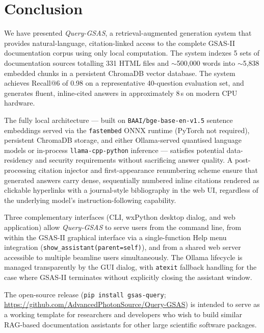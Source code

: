 \section{Conclusion}

We have presented \textit{Query-GSAS}, a retrieval-augmented generation system
that provides natural-language, citation-linked access to the complete
GSAS-II documentation corpus using only local computation.
The system indexes 5 sets of documentation sources totalling 331 HTML files and $\sim$500,000 words into $\sim$5{,}838 embedded chunks in a persistent ChromaDB vector database.
The system achieves Recall@6 of 0.98 on a representative 40-question
evaluation set, and generates fluent, inline-cited answers in
approximately 8\,s on modern CPU hardware.

The fully local architecture --- built on \texttt{BAAI/bge-base-en-v1.5}
sentence embeddings served via the \texttt{fastembed} ONNX runtime (PyTorch
not required), persistent ChromaDB storage, and either Ollama-served
quantised language models or in-process \texttt{llama-cpp-python}
inference --- satisfies potential data-residency and security requirements
without sacrificing answer quality.
A post-processing citation injector and first-appearance renumbering
scheme ensure that generated answers carry dense, sequentially numbered
inline citations rendered as clickable hyperlinks with a
journal-style bibliography in the web UI, regardless of the underlying
model's instruction-following capability.

Three complementary interfaces (CLI, wxPython desktop dialog, and
web application) allow \textit{Query-GSAS} to serve users from the command line,
from within the GSAS-II graphical interface via a single-function Help menu
integration (\texttt{show\_assistant(parent=self)}), and from a shared
web server accessible to multiple beamline users simultaneously.
The Ollama lifecycle is managed transparently by the GUI dialog, with
\texttt{atexit} fallback handling for the case where GSAS-II terminates
without explicitly closing the assistant window.

The open-source release (\texttt{pip install gsas-query};
\url{https://github.com/AdvancedPhotonSource/Query-GSAS}) is intended
to serve as a working template for researchers and developers who wish
to build similar RAG-based documentation assistants for other large
scientific software packages.

